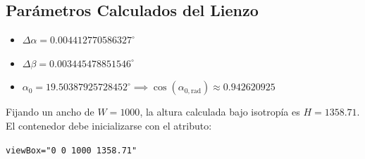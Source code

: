 \documentclass[12pt,a4paper]{article}
\begin{document}
\subsection{Parámetros Calculados del Lienzo}
\begin{itemize}
    \item $\Delta\alpha = 0.004412770586327^\circ$
    \item $\Delta\beta = 0.003445478851546^\circ$
    \item $\alpha_0 = 19.50387925728452^\circ \implies \cos(\alpha_{0,\text{rad}}) \approx 0.942620925$
\end{itemize}

Fijando un ancho de $W=1000$, la altura calculada bajo isotropía es $H=1358.71$. El contenedor debe inicializarse con el atributo:
\begin{center}
    \texttt{viewBox="0 0 1000 1358.71"}
\end{center}
\end{document}
